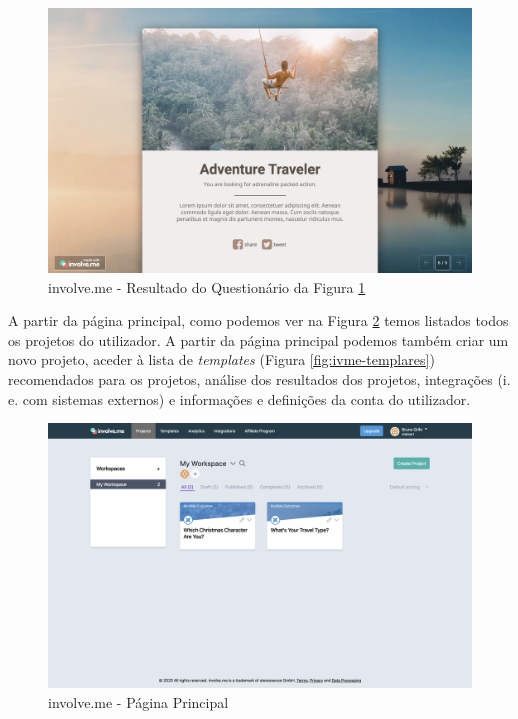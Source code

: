 \begin{figure}[ht!]
	\begin{center}
		\includegraphics[width=1\textwidth]{img/ivme/x2}
		\caption{involve.me - Resultado do Questionário da Figura \ref{fig:ivme-x2}}
		\label{fig:ivme-x2}
	\end{center}
\end{figure}

\pagebreak

A partir da página principal, como podemos ver na Figura \ref{fig:ivme-dash} temos listados todos os projetos do utilizador. A partir da página principal podemos também criar um novo projeto, aceder à lista de \textit{templates} (Figura \ref{fig:ivme-templares}) recomendados para os projetos, análise dos resultados dos projetos, integrações (i. e. com sistemas externos) e informações e definições da conta do utilizador. 

\begin{figure}[ht!]
	\begin{center}
		\includegraphics[width=1\textwidth]{img/ivme/dashboard}
		\caption{involve.me - Página Principal}
		\label{fig:ivme-dash}
	\end{center}
\end{figure}

